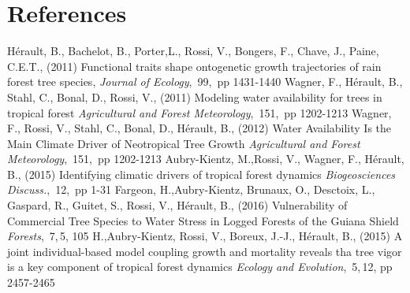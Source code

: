 \documentclass[review]{elsarticle}
\begin{document}

\section{References}

\begin{thebibliography}{99}
%
%
    \newblock H\'erault, B., Bachelot, B., Porter,L., Rossi, V., Bongers, F., Chave, J., Paine, C.E.T., (2011)  
    \newblock Functional traits shape ontogenetic growth trajectories of rain forest tree species,
    \newblock \emph{Journal of Ecology},\, 99, \,pp 1431-1440    
%
%
    \newblock Wagner, F., H\'erault, B., Stahl, C., Bonal, D., Rossi, V., (2011)
    \newblock Modeling water availability for trees in tropical forest
    \newblock \emph{Agricultural and Forest Meteorology},\, 151,\, pp 1202-1213
%
%
    \newblock Wagner, F., Rossi, V., Stahl, C., Bonal, D., H\'erault, B., (2012)
    \newblock Water Availability Is the Main Climate Driver of Neotropical Tree Growth
    \newblock \emph{Agricultural and Forest Meteorology},\, 151,\, pp 1202-1213
%
%
    \newblock Aubry-Kientz, M.,Rossi, V., Wagner, F., H\'erault, B., (2015)
    \newblock Identifying climatic drivers of tropical forest dynamics
    \newblock \emph{Biogeosciences Discuss.},\, 12,\, pp 1-31        
%
%
    \newblock Fargeon, H.,Aubry-Kientz, Brunaux, O., Desctoix, L., Gaspard, R., Guitet, S., Rossi, V., H\'erault, B., (2016)
    \newblock Vulnerability of Commercial Tree Species to Water Stress in Logged Forests of the Guiana Shield
    \newblock \emph{Forests},\, 7,\,5,\,\,105
%
%
    \newblock H.,Aubry-Kientz, Rossi, V., Boreux, J.-J., H\'erault, B., (2015)
    \newblock A joint individual-based model coupling growth and mortality reveals tha tree vigor is a key component of tropical forest dynamics
    \newblock \emph{Ecology and Evolution},\, 5,\,12,\,\,pp 2457-2465    
    
    
    
    \end{thebibliography}
\end{document}
